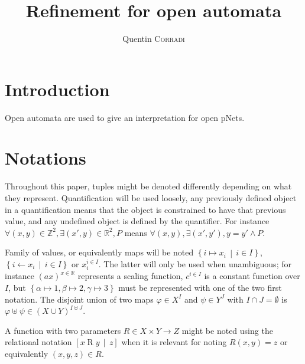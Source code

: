 \documentclass{article}
\title{Refinement for open automata}
\author{Quentin \textsc{Corradi}}
\theoremstyle{plain}
\theoremstyle{definition}
\newcommand\setR{\mathbb{R}}
\newcommand\setZ{\mathbb{Z}}
\newcommand\mpar[1]{{\left(#1\right)}}
\newcommand\mbrk[1]{{\left[#1\right]}}
\newcommand\mbrc[1]{{\left\{#1\right\}}}
\newcommand\midbar{\,\middle|\,}
\newcommand\mset[2]{\mbrc{#1\midbar #2}}
\newcommand\prel[4]{\mbrk{#2\mathrel{#1}#3\midbar #4}}
\begin{document}
\maketitle


\section{Introduction}
Open automata are used to give an interpretation for open pNets.


\section{Notations}
Throughout this paper, tuples might be denoted differently depending on what they represent.
Quantification will be used loosely, any previously defined object in a quantification means that the object is constrained to have that previous value, and any undefined object is defined by the quantifier.
For instance \(\forall \mpar{x, y} \in \setZ^2, \exists \mpar{x', y} \in \setR^2, P\) means \(\forall \mpar{x, y}, \exists \mpar{x', y'}, y = y' \wedge P\).

Family of values, or equivalently maps will be noted \(\mset{i \mapsto x_i}{i \in I}\), \(\mset{i \gets x_i}{i \in I}\) or \(x_i^{i \in I}\).
The latter will only be used when unambiguous; for instance \(\mpar{ax}^{x \in \setR}\) represents a scaling function, \(c^{i \in I}\) is a constant function over \(I\), but \(\mbrc{\alpha \mapsto 1, \beta \mapsto 2, \gamma \mapsto 3}\) must be represented with one of the two first notation.
The disjoint union of two maps \(\varphi \in X^I\) and \(\psi \in Y^J\) with \(I \cap J = \emptyset\) is \(\varphi \uplus \psi \in \mpar{X \cup Y}^{I \uplus J}\).

A function with two parameters \(R \in X \times Y \to Z\) might be noted using the relational notation \(\prel{R}{x}{y}{z}\) when it is relevant for noting \(R\mpar{x, y} = z\) or equivalently \(\mpar{x, y, z} \in R\).
\end{document}
